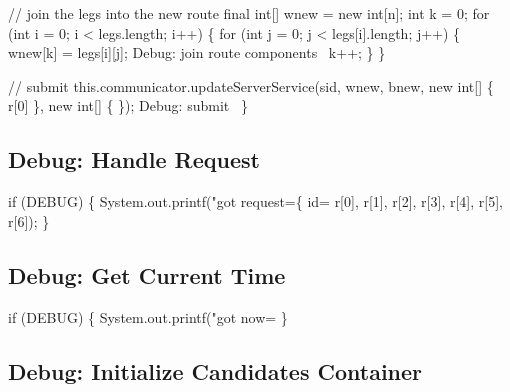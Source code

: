   // join the legs into the new route
  final int[] wnew = new int[n];
  int k = 0;
  for (int i = 0; i < legs.length; i++) \{
    for (int j = 0; j < legs[i].length; j++) \{
      wnew[k] = legs[i][j];
      \LA{}Debug: join route components~{\nwtagstyle{}}\RA{}
      k++;
    \}
  \}

  // submit
  this.communicator.updateServerService(sid, wnew, bnew,
      new int[] \{ r[0] \}, new int[] \{ \});
  \LA{}Debug: submit~{\nwtagstyle{}}\RA{}
\}
\nwendcode{}\nwdocspar

\subsection{Debug: Handle Request}

\nwenddocs{}\endmoddef\nwstartdeflinemarkup{}\nwenddeflinemarkup
if (DEBUG) \{
  System.out.printf("got request=\{ id=%
      r[0], r[1], r[2], r[3], r[4], r[5], r[6]);
\}
\nwendcode{}\nwdocspar

\subsection{Debug: Get Current Time}

\nwenddocs{}\endmoddef\nwstartdeflinemarkup{}\nwenddeflinemarkup
if (DEBUG) \{
  System.out.printf("got now=%
\}
\nwendcode{}\nwdocspar

\subsection{Debug: Initialize Candidates Container}

